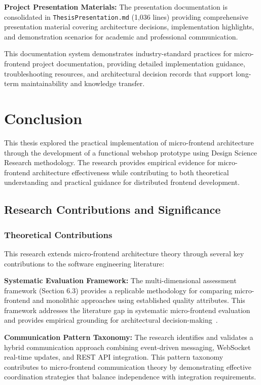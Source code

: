 \documentclass[12pt,a4paper]{report}
\begin{document}
\textbf{Project Presentation Materials:} The presentation documentation is consolidated in \texttt{ThesisPresentation.md} (1,036 lines) providing comprehensive presentation material covering architecture decisions, implementation highlights, and demonstration scenarios for academic and professional communication.

This documentation system demonstrates industry-standard practices for micro-frontend project documentation, providing detailed implementation guidance, troubleshooting resources, and architectural decision records that support long-term maintainability and knowledge transfer.

\chapter{Conclusion}

This thesis explored the practical implementation of micro-frontend architecture through the development of a functional webshop prototype using Design Science Research methodology. The research provides empirical evidence for micro-frontend architecture effectiveness while contributing to both theoretical understanding and practical guidance for distributed frontend development.

\section{Research Contributions and Significance}

\subsection{Theoretical Contributions}

This research extends micro-frontend architecture theory through several key contributions to the software engineering literature:

\textbf{Systematic Evaluation Framework:} The multi-dimensional assessment framework (Section 6.3) provides a replicable methodology for comparing micro-frontend and monolithic approaches using established quality attributes. This framework addresses the literature gap in systematic micro-frontend evaluation and provides empirical grounding for architectural decision-making~\cite{bass2012software}.

\textbf{Communication Pattern Taxonomy:} The research identifies and validates a hybrid communication approach combining event-driven messaging, WebSocket real-time updates, and REST API integration. This pattern taxonomy contributes to micro-frontend communication theory by demonstrating effective coordination strategies that balance independence with integration requirements.
\end{document}
